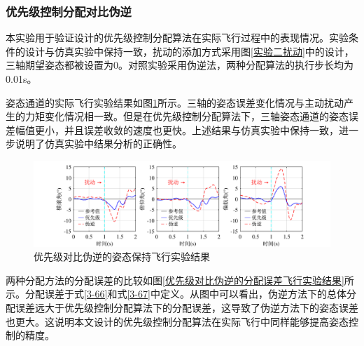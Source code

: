 \subsubsection{优先级控制分配对比伪逆}

本实验用于验证设计的优先级控制分配算法在实际飞行过程中的表现情况。实验条件的设计与仿真实验中保持一致，扰动的添加方式采用图\ref{实验二扰动}中的设计，三轴期望姿态都被设置为0。对照实验采用伪逆法，两种分配算法的执行步长均为0.01s。

姿态通道的实际飞行实验结果如图\ref{优先级对比伪逆的姿态保持飞行实验结果}所示。三轴的姿态误差变化情况与主动扰动产生的力矩变化情况相一致。但是在优先级控制分配算法下，三轴姿态通道的姿态误差幅值更小，并且误差收敛的速度也更快。上述结果与仿真实验中保持一致，进一步说明了仿真实验中结果分析的正确性。
\begin{figure}[htbp]
	\centering
	\begin{minipage}[c]{1\textwidth}
        \centering
        \includegraphics[scale=1]{Fig/优先级对比伪逆的姿态保持飞行实验结果.pdf}
        \caption{\label{优先级对比伪逆的姿态保持飞行实验结果}优先级对比伪逆的姿态保持飞行实验结果}
        \end{minipage}
\end{figure}

两种分配方法的分配误差的比较如图\ref{优先级对比伪逆的分配误差飞行实验结果}所示。分配误差于式\eqref{3-66}和式\eqref{3-67}中定义。从图中可以看出，伪逆方法下的总体分配误差远大于优先级控制分配算法下的分配误差，这导致了伪逆方法下的姿态误差也更大。这说明本文设计的优先级控制分配算法在实际飞行中同样能够提高姿态控制的精度。

